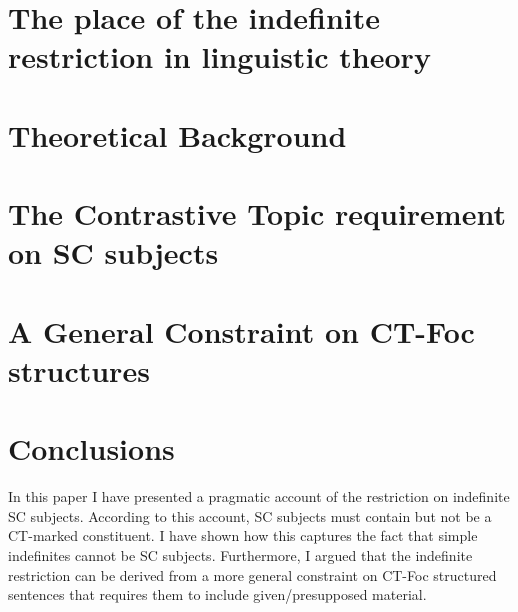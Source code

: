 \documentclass[letterpaper]{article}
\begin{document}
\section{The place of the indefinite restriction in linguistic theory}\label{sec:LitReview}

\section{Theoretical Background}\label{sec:TheoryBackground}

\section{The Contrastive Topic requirement on SC subjects}\label{sec:MainArgument}

\section{A General Constraint on CT-Foc structures}\label{sec:GenConst}

%
\section{Conclusions}\label{sec:Conclusion}
In this paper I have presented a pragmatic account of the restriction on indefinite SC subjects.
According to this account, SC subjects must contain but not be a CT-marked constituent.
I have shown how this captures the fact that simple indefinites cannot be SC subjects.
Furthermore, I argued that the indefinite restriction can be derived from a more general constraint on CT-Foc structured sentences that requires them to include given/presupposed material.

\printbibliography
\end{document}

